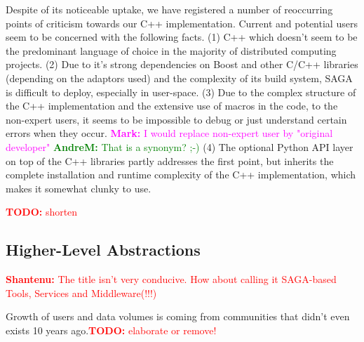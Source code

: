 \documentclass[]{article}
\newcommand{\B}[1]{\textbf{#1}}
\newcommand{\todo}[1]{{\textcolor{red}{\B{TODO:} #1 }}}
\newcommand{\jhanote}[1]{{\textcolor{red}{     \B{Shantenu:} #1 }}}
\newcommand{\amnote}[1]{{\textcolor{green}{   \B{AndreM:  } #1 }}}
\newcommand{\ownote}[1]{{\textcolor{Brown}{   \B{Ole:     } #1 }}}
\newcommand{\msnote}[1]{{\textcolor{magenta}{ \B{Mark:    } #1 }}}
\newcommand{\jhanote}[1]{}
\newcommand{\amnote}[1]{}
\newcommand{\ownote}[1]{}
\newcommand{\msnote}[1]{}
\begin{document}
  Despite of its noticeable uptake, we have registered a number of
  reoccurring points of criticism towards our C++ implementation.
  Current and potential users seem to be concerned with the following
  facts. 
  (1) C++ which doesn't seem to be the predominant language of choice
  in the majority of distributed computing projects.
  (2) Due to it's strong dependencies on Boost and other C/C++
  libraries (depending on the adaptors used) and the complexity of its
  build system, SAGA is difficult to deploy, especially in user-space.
  (3) Due to the complex structure of the C++ implementation and the
  extensive use of macros in the code, to the non-expert users, it
  seems to be impossible to debug or just understand certain errors
  when they occur.  \msnote{I would replace non-expert user by
  "original developer"} \amnote{That is a synonym? ;-)}
  (4) The optional Python API layer on top of the C++ libraries partly
  addresses the first point, but inherits the complete installation
  and runtime complexity of the C++ implementation, which makes it
  somewhat clunky to use.

  \todo{shorten}


 \subsection{Higher-Level Abstractions}
 \jhanote{The title isn't very conducive. How about calling it
   SAGA-based Tools, Services and Middleware(!!!)}




  Growth of users and data volumes is coming from communities that
  didn't even exists 10 years ago.\todo{elaborate or remove!}
 
\end{document}
